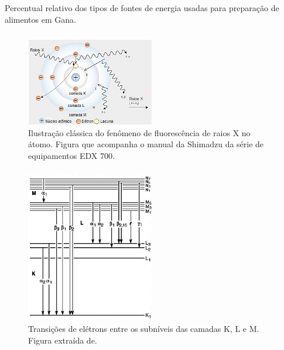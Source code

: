 \begin{frame}
  \frametitle{}
  \begin{table}[H]
  	\centering
  	
  	\caption{Percentual relativo dos tipos de fontes de energia usadas para preparação 
  		    de alimentos em Gana. 
  		\label{table:cookfuel}}
  \end{table}
\end{frame}

\begin{frame}
  \frametitle{}
  \begin{figure}[H]
    \centering
    \includegraphics[width=0.5\textwidth]{../../inputs/images/shimadzu_atomo.jpg}
    \caption{Ilustração clássica do fenômeno de fluorescência de raios X no átomo. 
             Figura que acompanha o manual da Shimadzu da série de equipamentos
             EDX 700. \label{fig:shimadzu_atomo}}
  \end{figure}
\end{frame}

\begin{frame}
  \frametitle{}
  \begin{figure}[H]
    \centering 
    \includegraphics[width=0.5\textwidth]{../../inputs/images/Siegbahn.jpg}
    \caption{Transições de elétrons entre os subníveis das camadas K, L e M. 
             Figura extraída de. \label{fig:siegbahn}}
  \end{figure}
\end{frame}

